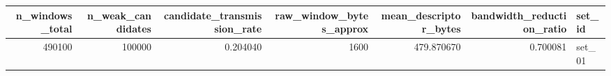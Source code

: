 \begin{tabular}{rrrrrrl}
\toprule
n_windows_total & n_weak_candidates & candidate_transmission_rate & raw_window_bytes_approx & mean_descriptor_bytes & bandwidth_reduction_ratio & set_id \\
\midrule
490100 & 100000 & 0.204040 & 1600 & 479.870670 & 0.700081 & set_01 \\
\bottomrule
\end{tabular}
